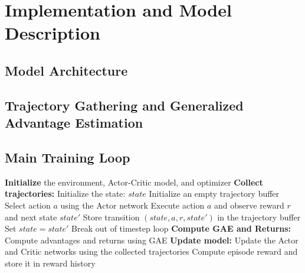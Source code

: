 \section{Implementation and Model Description}
\label{sec:implementation-and-model-description}

\subsection{Model Architecture}
\label{subsec:model-architecture}

\subsection{Trajectory Gathering and Generalized Advantage Estimation}
\label{subsec:trajectory-gathering-and-gae}

\subsection{Main Training Loop}
\begin{algorithmic}
    \State \textbf{Initialize} the environment, Actor-Critic model, and optimizer
        \State \textbf{Collect trajectories:}
        \State \hspace{1em} Initialize the state: $state$
        \State \hspace{1em} Initialize an empty trajectory buffer
            \State \hspace{1em} Select action $a$ using the Actor network
            \State \hspace{1em} Execute action $a$ and observe reward $r$ and next state $state'$
            \State \hspace{1em} Store transition $(state, a, r, state')$ in the trajectory buffer
            \State \hspace{1em} Set $state = state'$
                \State \hspace{1em} Break out of timestep loop
            \EndIf
        \EndFor
        \State \textbf{Compute GAE and Returns:}
        \State \hspace{1em} Compute advantages and returns using GAE
        \State \textbf{Update model:}
        \State \hspace{1em} Update the Actor and Critic networks using the collected trajectories
        \State \hspace{1em} Compute episode reward and store it in reward history
    \EndFor
\end{algorithmic}

